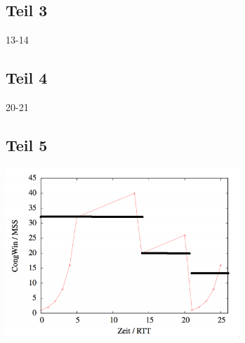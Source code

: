 \documentclass[10pt,a4paper]{article}
\begin{document}
\subsection{Teil 3}

13-14

\subsection{Teil 4}

20-21

\subsection{Teil 5}

\includegraphics[width=250pt]{5_8_5.png}
\end{document}
